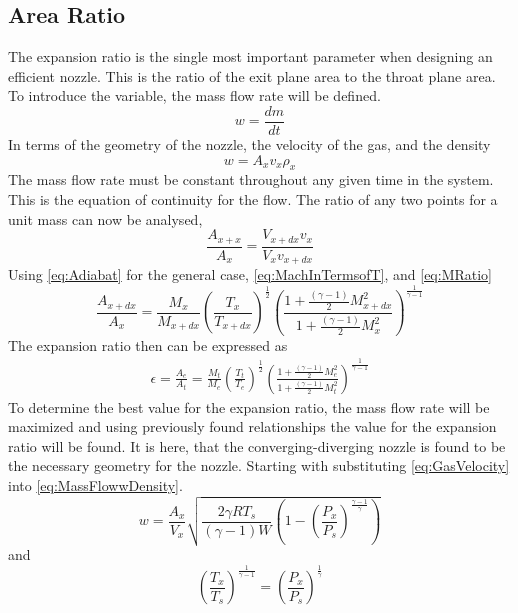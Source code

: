 \subsection{Area Ratio}
The expansion ratio is the single most important parameter when designing an efficient nozzle. This is the ratio of the exit plane area to the throat plane area. To introduce the variable, the mass flow rate will be defined.
\begin{equation}\label{eq:MassFlow}
w=\frac{dm}{dt}
\end{equation}
In terms of the geometry of the nozzle, the velocity of the gas, and the density
\begin{equation}
w=A_xv_x\rho_x
\end{equation}%
The mass flow rate must be constant throughout any given time in the system. This is the equation of continuity for the flow. The ratio of any two points for a unit mass can now be analysed,
\begin{equation}\label{eq:MassFlowwDensity}
\frac{A_{x+x}}{A_x}=\frac{V_{x+dx}v_x}{V_xv_{x+dx}}
\end{equation}
Using \ref{eq:Adiabat} for the general case, \ref{eq:MachInTermsofT}, and \ref{eq:MRatio}
\begin{equation}
\frac{A_{x+dx}}{A_x}=\frac{M_x}{M_{x+dx}}\left(\frac{T_x}{T_{x+dx}}\right)^\frac{1}{2}\left(\frac{1+\frac{(\gamma-1)}{2}M_{x+dx}^2}{1+\frac{(\gamma-1)}{2}M_x^2}\right)^{\frac{1}{\gamma-1}}
\end{equation}
The expansion ratio then can be expressed as
\begin{align}
\epsilon=\frac{A_e}{A_t}=\frac{M_t}{M_e}\left(\frac{T_t}{T_e}\right)^\frac{1}{2}\left(\frac{1+\frac{(\gamma-1)}{2}M_e^2}{1+\frac{(\gamma-1)}{2}M_t^2}\right)^{\frac{1}{\gamma-1}}
\end{align}%
To determine the best value for the expansion ratio, the mass flow rate will be maximized and using previously found relationships the value for the expansion ratio will be found. It is here, that the converging-diverging nozzle is found to be the necessary geometry for the nozzle. Starting with substituting \ref{eq:GasVelocity} into \ref{eq:MassFlowwDensity}.
\begin{equation}\label{eq:WforAll}
w=\frac{A_x}{V_x}\sqrt{\frac{2\gamma RT_s}{(\gamma-1)W}\left(1-\left(\frac{P_x}{P_s}\right)^{\frac{\gamma-1}{\gamma}}\right)}
\end{equation}
and
\begin{equation}\label{eq:TtoP}
\left(\frac{T_x}{T_s}\right)^{\frac{1}{\gamma-1}}=\left(\frac{P_x}{P_s}\right)^{\frac{1}{\gamma}}
\end{equation}
